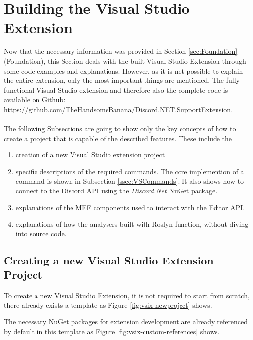 \section{Building the Visual Studio Extension}
\label{sec:VSExtension}
Now that the necessary information was provided in Section \ref{sec:Foundation} (Foundation), this Section deals with the built Visual Studio Extension through some code examples and explanations. However, as it is not possible to explain the entire extension, only the most important things are mentioned. The fully functional Visual Studio extension and therefore also the complete code is available on Github: \url{https://github.com/TheHandsomeBanana/Discord.NET.SupportExtension}.\\\\
The following Subsections are going to show only the key concepts of how to create a project that is capable of the described features. These include the
\begin{enumerate}
	\item creation of a new Visual Studio extension project
	\item specific descriptions of the required commands. The core implemention of a command is shown in Subsection \ref{ssec:VSCommands}. It also shows how to connect to the Discord API using the \textit{Discord.Net} NuGet package.
	\item explanations of the MEF components used to interact with the Editor API.
	\item explanations of how the analysers built with Roslyn function, without diving into source code.
\end{enumerate}


\subsection{Creating a new Visual Studio Extension Project}
\label{ssec:NewExtensionProject}
To create a new Visual Studio Extension, it is not required to start from scratch, there already exists a template as Figure \ref{fig:vsix-newproject} shows.

The necessary NuGet packages for extension development are already referenced by default in this template as Figure \ref{fig:vsix-custom-references} shows.


